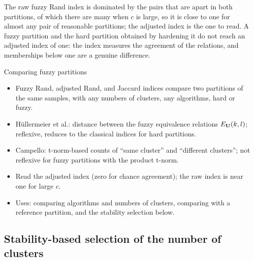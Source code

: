 The raw fuzzy Rand index is dominated by the pairs that are apart in both partitions, of which there are many when $c$ is large, so it is close to one for almost any pair of reasonable partitions; the adjusted index is the one to read. A fuzzy partition and the hard partition obtained by hardening it do not reach an adjusted index of one: the index measures the agreement of the relations, and memberships below one are a genuine difference.

\begin{summarybox}{Comparing fuzzy partitions}
\begin{itemize}
  \item Fuzzy Rand, adjusted Rand, and Jaccard indices compare two partitions of the same samples, with any numbers of clusters, any algorithms, hard or fuzzy.
  \item Hüllermeier et al.: distance between the fuzzy equivalence relations $E_{\mathbf{U}}(k,l)$; reflexive, reduces to the classical indices for hard partitions.
  \item Campello: t-norm-based counts of ``same cluster'' and ``different clusters''; not reflexive for fuzzy partitions with the product t-norm.
  \item Read the adjusted index (zero for chance agreement); the raw index is near one for large $c$.
  \item Uses: comparing algorithms and numbers of clusters, comparing with a reference partition, and the stability selection below.
\end{itemize}
\end{summarybox}

\subsection{Stability-based selection of the number of clusters}\label{sec:val:stability}

